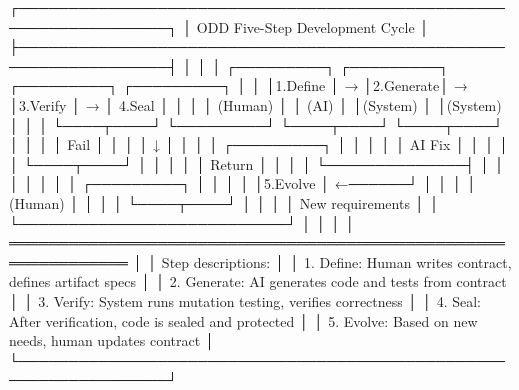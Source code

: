 \documentclass[
]{article}
\newenvironment{Shaded}{}{}
\newcommand{\NormalTok}[1]{#1}
\begin{document}
\begin{Shaded}
\begin{Highlighting}[]
\NormalTok{┌─────────────────────────────────────────────────────────────────┐}
\NormalTok{│                   ODD Five{-}Step Development Cycle                │}
\NormalTok{├─────────────────────────────────────────────────────────────────┤}
\NormalTok{│                                                                  │}
\NormalTok{│  ┌─────────┐   ┌─────────┐   ┌─────────┐   ┌─────────┐         │}
\NormalTok{│  │1.Define │ → │2.Generate│ → │3.Verify │ → │ 4.Seal  │         │}
\NormalTok{│  │ (Human) │   │  (AI)   │   │(System) │   │(System) │         │}
\NormalTok{│  └────┬────┘   └─────────┘   └────┬────┘   └────┬────┘         │}
\NormalTok{│       │                           │ Fail        │               │}
\NormalTok{│       │                           ↓              │               │}
\NormalTok{│       │                      ┌─────────┐        │               │}
\NormalTok{│       │                      │ AI Fix  │        │               │}
\NormalTok{│       │                      └────┬────┘        │               │}
\NormalTok{│       │                           │ Return       │               │}
\NormalTok{│       │                           └──────────────┤               │}
\NormalTok{│       │                                          │               │}
\NormalTok{│       │                      ┌─────────┐        │               │}
\NormalTok{│       │                      │5.Evolve │ ←──────┘               │}
\NormalTok{│       │                      │ (Human) │                         │}
\NormalTok{│       │                      └────┬────┘                         │}
\NormalTok{│       │                           │ New requirements             │}
\NormalTok{│       └───────────────────────────┘                              │}
\NormalTok{│                                                                  │}
\NormalTok{│  ══════════════════════════════════════════════════════════════  │}
\NormalTok{│  Step descriptions:                                             │}
\NormalTok{│  1. Define: Human writes contract, defines artifact specs       │}
\NormalTok{│  2. Generate: AI generates code and tests from contract         │}
\NormalTok{│  3. Verify: System runs mutation testing, verifies correctness  │}
\NormalTok{│  4. Seal: After verification, code is sealed and protected      │}
\NormalTok{│  5. Evolve: Based on new needs, human updates contract          │}
\NormalTok{└─────────────────────────────────────────────────────────────────┘}
\end{Highlighting}
\end{Shaded}
\end{document}

